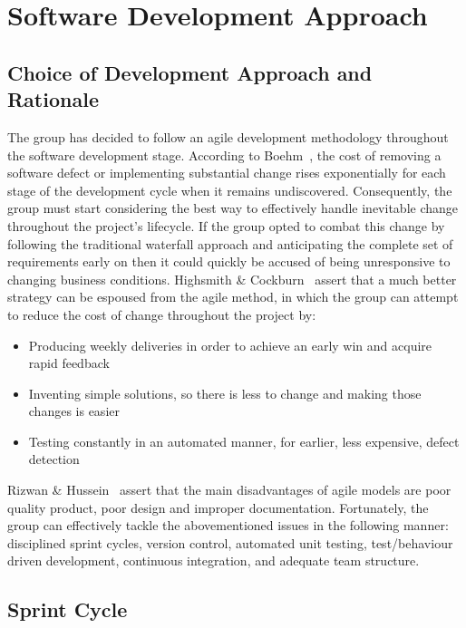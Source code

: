 \section{Software Development Approach}

\subsection{Choice of Development Approach and Rationale}

The group has decided to follow an agile development methodology throughout the software development stage. According to Boehm~\parencite{book:software_engineering_economics}, the cost of removing a software defect or implementing substantial change rises exponentially for each stage of the development cycle when it remains undiscovered. Consequently, the group must start considering the best way to effectively handle inevitable change throughout the project’s lifecycle. If the group opted to combat this change by following the traditional waterfall approach and anticipating the complete set of requirements early on then it could quickly be accused of being unresponsive to changing business conditions. Highsmith \& Cockburn~\parencite{art:agile_business_innovation} assert that a much better strategy can be espoused from the agile method, in which the group can attempt to reduce the cost of change throughout the project by:

\begin{itemize}
  \item Producing weekly deliveries in order to achieve an early win and acquire rapid feedback
  \item Inventing simple solutions, so there is less to change and making those changes is easier
  \item Testing constantly in an automated manner, for earlier, less expensive, defect detection
\end{itemize}

Rizwan \& Hussein~\parencite{art:adaptive_sdpm} assert that the main disadvantages of agile models are poor quality product, poor design and improper documentation. Fortunately, the group can effectively tackle the abovementioned issues in the following manner: disciplined sprint cycles, version control, automated unit testing, test/behaviour driven development, continuous integration, and adequate team structure.

\subsection{Sprint Cycle}

